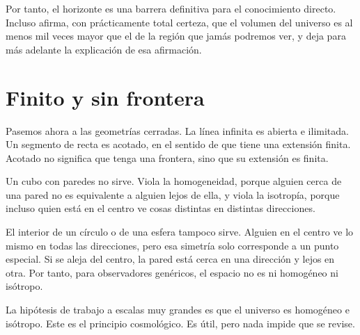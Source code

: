 \begin{classroomqa}\end{classroomqa}

Por tanto, el horizonte es una barrera definitiva para el conocimiento directo. Incluso afirma, con prácticamente total certeza, que el volumen del universo es al menos mil veces mayor que el de la región que jamás podremos ver, y deja para más adelante la explicación de esa afirmación.

\section{Finito y sin frontera}

Pasemos ahora a las geometrías cerradas. La línea infinita es abierta e ilimitada. Un segmento de recta es acotado, en el sentido de que tiene una extensión finita. Acotado no significa que tenga una frontera, sino que su extensión es finita.

Un cubo con paredes no sirve. Viola la homogeneidad, porque alguien cerca de una pared no es equivalente a alguien lejos de ella, y viola la isotropía, porque incluso quien está en el centro ve cosas distintas en distintas direcciones.

El interior de un círculo o de una esfera tampoco sirve. Alguien en el centro ve lo mismo en todas las direcciones, pero esa simetría solo corresponde a un punto especial. Si se aleja del centro, la pared está cerca en una dirección y lejos en otra. Por tanto, para observadores genéricos, el espacio no es ni homogéneo ni isótropo.

La hipótesis de trabajo a escalas muy grandes es que el universo es homogéneo e isótropo. Este es el principio cosmológico. Es útil, pero nada impide que se revise.

\begin{classroomqa}\end{classroomqa}

